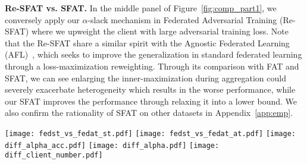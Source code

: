 \documentclass{article} %
\theoremstyle{plain}
\theoremstyle{definition}
\theoremstyle{remark}
\begin{document}
\textbf{Re-SFAT vs. SFAT.} In the middle panel of Figure~\ref{fig:comp_part1}, we conversely apply our $\alpha$-slack mechanism in Federated Adversarial Training (Re-SFAT) where we upweight the client with large adversarial training loss. Note that the Re-SFAT share a similar spirit with the Agnostic Federated Learning (AFL)~\citep{mohri2019agnostic}, which seeks to improve the generalization in standard federated learning through a loss-maximization reweighting. Through its comparison with FAT and SFAT, we can see enlarging the inner-maximization during aggregation could severely exacerbate heterogeneity which results in the worse performance, while our SFAT improves the performance through relaxing it into a lower bound. We also confirm the rationality of SFAT on other datasets in Appendix~\ref{app:emp}. 


\begin{figure*}[t!]
\vspace{-2mm}
    \centering
    \hspace{-0.15in}
    \texttt{[image: fedst\_vs\_fedat\_st.pdf]}
    \texttt{[image: fedst\_vs\_fedat\_at.pdf]}
    \texttt{[image: diff\_alpha\_acc.pdf]}
    \texttt{[image: diff\_alpha.pdf]}
    \texttt{[image: diff\_client\_number.pdf]}
    \caption{Ablation study on SFAT.  Left two panels: comparison between federated standard training and federated adversarial training respectively in combination with the $\alpha$-slack mechanism, \textit{i.e.,} SFST vs. SFAT ($\alpha=1/11$). Middle panel: comparison between FAT, SFAT and Re-SFAT (the reverse operation which upweights the clients with large adversarial training loss). Right two panels: the natural accuracy and the robust accuracy of SFAT with different $\alpha$ and different $\widehat{K}$ on CIFAR-10.}
    \label{fig:comp_part1}
    \vspace{-2mm}
\end{figure*}
\end{document}
